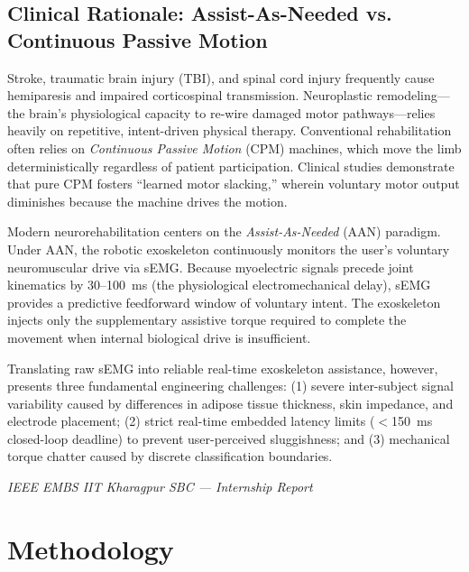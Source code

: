 \documentclass[12pt,a4paper]{article}
\begin{document}
\subsection{Clinical Rationale: Assist-As-Needed vs. Continuous Passive Motion}

Stroke, traumatic brain injury (TBI), and spinal cord injury frequently cause hemiparesis and impaired corticospinal transmission. Neuroplastic remodeling---the brain's physiological capacity to re-wire damaged motor pathways---relies heavily on repetitive, intent-driven physical therapy. Conventional rehabilitation often relies on \textit{Continuous Passive Motion} (CPM) machines, which move the limb deterministically regardless of patient participation. Clinical studies demonstrate that pure CPM fosters ``learned motor slacking,'' wherein voluntary motor output diminishes because the machine drives the motion.

Modern neurorehabilitation centers on the \textit{Assist-As-Needed} (AAN) paradigm. Under AAN, the robotic exoskeleton continuously monitors the user's voluntary neuromuscular drive via sEMG. Because myoelectric signals precede joint kinematics by 30--100~ms (the physiological electromechanical delay), sEMG provides a predictive feedforward window of voluntary intent. The exoskeleton injects only the supplementary assistive torque required to complete the movement when internal biological drive is insufficient.

Translating raw sEMG into reliable real-time exoskeleton assistance, however, presents three fundamental engineering challenges: (1) severe inter-subject signal variability caused by differences in adipose tissue thickness, skin impedance, and electrode placement; (2) strict real-time embedded latency limits ($<$150~ms closed-loop deadline) to prevent user-perceived sluggishness; and (3) mechanical torque chatter caused by discrete classification boundaries.

\vfill
\begin{center}
    \footnotesize\textit{IEEE EMBS IIT Kharagpur SBC --- Internship Report}
\end{center}

\newpage
\section{Methodology}\label{sec:methodology}
\end{document}
